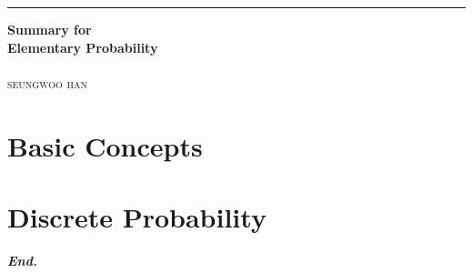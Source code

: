 \documentclass[a4paper,12pt]{report}
\begin{document}

\begin{titlepage}
	\raggedleft

	\rule{1pt}{\textheight}
	\hspace{0.05\textwidth}
	\parbox[b]{0.75\textwidth}{

        {\Huge\bfseries Summary for\\[0.5\baselineskip] Elementary Probability}\\[2\baselineskip]
		\\[4\baselineskip]
		{\Large\textsc{seungwoo han}}

		\vspace{0.5\textheight}
	}
\end{titlepage}
\tableofcontents
\hypersetup{
    linkcolor=Maroon,
    filecolor=black,
    urlcolor=Maroon,
}
\pagebreak

\tcbstartdraftmode

\chapter{Basic Concepts}





\chapter{Discrete Probability}





\vfill
\begin{center}
    \textbf{\textit{End.}}
\end{center}
\end{document}
